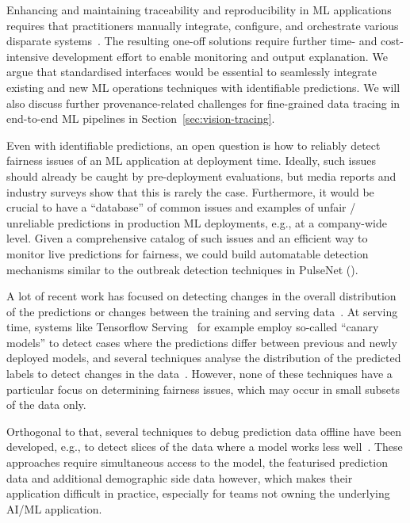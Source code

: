  Enhancing and maintaining traceability and reproducibility in ML applications requires that practitioners manually integrate, configure, and orchestrate various disparate systems~\cite{traceabilityAndReproducibility23,tensorflowPatterns21}. The resulting one-off solutions require further time- and cost-intensive development effort to enable monitoring and output explanation. We argue that standardised interfaces would be essential to seamlessly integrate existing and new ML operations techniques with identifiable predictions.
%
We will also discuss further provenance-related challenges for fine-grained data tracing in end-to-end ML pipelines in Section~\ref{sec:vision-tracing}. 


 Even with identifiable predictions, an open question is how to reliably detect fairness issues of an ML application at deployment time. Ideally, such issues should already be caught by pre-deployment evaluations, but media reports and industry surveys show that this is rarely the case. Furthermore, it would be crucial to have a ``database'' of common issues and examples of unfair / unreliable predictions in production ML deployments, e.g., at a company-wide level. Given a comprehensive catalog of such issues and an efficient way to monitor live predictions for fairness, we could build automatable detection mechanisms similar to the outbreak detection techniques in PulseNet ().

 A lot of recent work has focused on detecting changes in the overall distribution of the predictions or changes between the training and serving data~\cite{nigenda2022amazon}. At serving time, systems like Tensorflow Serving~\cite{olston2017tensorflow} for example employ so-called ``canary models'' to detect cases where the predictions differ between previous and newly deployed models, and several techniques analyse the distribution of the predicted labels to detect changes in the data~\cite{lipton2018detecting,schelter2020learning}. However, none of these techniques have a particular focus on determining fairness issues, which may occur in small subsets of the data only. 

Orthogonal to that, several techniques to debug prediction data offline have been developed, e.g., to detect slices of the data where a model works less well~\cite{chung2019slice,sagadeeva2021sliceline}. These approaches require simultaneous access to the model, the featurised prediction data and additional demographic side data however, which makes their application difficult in practice, especially for teams not owning the underlying AI/ML application.


